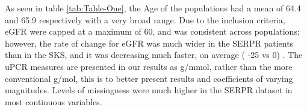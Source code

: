 \documentclass[
]{article}
\begin{document}
As seen in table \ref{tab:Table-One}, the Age of the populations had a mean of 64.4 and 65.9 respectively with a very broad range. Due to the inclusion criteria, eGFR were capped at a maximum of 60, and was consistent across populations; however, the rate of change for eGFR was much wider in the SERPR patients than in the SKS, and it was decreasing much faster, on average ( -25 vs 0) . The uPCR measures are presented in our results as g/mmol, rather than the more conventional g/mol, this is to better present results and coefficients of varying magnitudes. Levels of missingness were much higher in the SERPR dataset in most continuous variables.

\begin{landscape}\begin{table}


\end{table}
\end{landscape}
\end{document}
